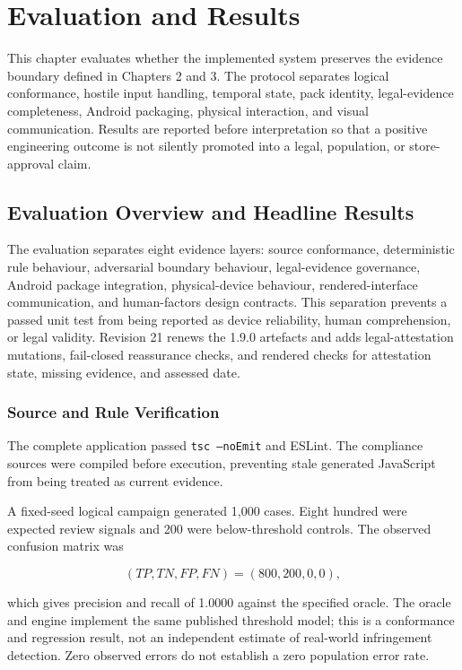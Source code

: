 \section{Evaluation and Results}

This chapter evaluates whether the implemented system preserves the evidence boundary defined in Chapters 2 and 3. The protocol separates logical conformance, hostile input handling, temporal state, pack identity, legal-evidence completeness, Android packaging, physical interaction, and visual communication. Results are reported before interpretation so that a positive engineering outcome is not silently promoted into a legal, population, or store-approval claim.

\subsection{Evaluation Overview and Headline Results}

The evaluation separates eight evidence layers: source conformance, deterministic rule behaviour, adversarial boundary behaviour, legal-evidence governance, Android package integration, physical-device behaviour, rendered-interface communication, and human-factors design contracts. This separation prevents a passed unit test from being reported as device reliability, human comprehension, or legal validity. Revision 21 renews the 1.9.0 artefacts and adds legal-attestation mutations, fail-closed reassurance checks, and rendered checks for attestation state, missing evidence, and assessed date.

\subsubsection{Source and Rule Verification}

The complete application passed \texttt{tsc --noEmit} and ESLint. The compliance sources were compiled before execution, preventing stale generated JavaScript from being treated as current evidence.

A fixed-seed logical campaign generated 1,000 cases. Eight hundred were expected review signals and 200 were below-threshold controls. The observed confusion matrix was

\begin{equation}
(TP,TN,FP,FN)=(800,200,0,0),
\end{equation}

which gives precision and recall of 1.0000 against the specified oracle. The oracle and engine implement the same published threshold model; this is a conformance and regression result, not an independent estimate of real-world infringement detection. Zero observed errors do not establish a zero population error rate.

